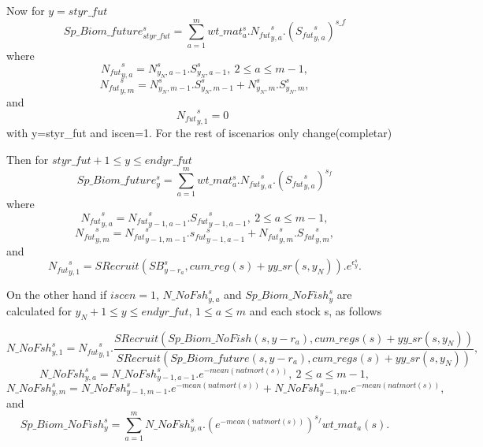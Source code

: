 \documentclass{article}
\begin{document}
Now for $y=styr\_fut$
\begin{equation}
    Sp\_Biom\_future^s_{styr\_fut}= \sum_{a=1}^mwt\_{mat}^s_a.{N_{fut}}^s_{y,a}.({{S_{fut}}^s_{y,a}})^{s\_f}
\end{equation}
where 
\begin{equation}
    {N_{fut}}^s_{y,a}=N^s_{y_N,a-1}.S^s_{y_N,a-1}, \ 2\leq a \leq m-1,
\end{equation}
\begin{equation}
    {N_{fut}}^s_{y,m}=N^s_{y_N,m-1}.S^s_{y_N,m-1}+N^s_{y_N,m}.S^s_{y_N,m},
\end{equation}
and 
\begin{equation}
    {N_{fut}}^s_{y,1}=0 \ \ 
\end{equation}
with y=styr\_fut and iscen=1. For the rest of iscenarios only change(completar) 
\begin{equation}
    
\end{equation}


Then for $styr\_fut+1 \leq y \leq endyr\_fut$
\begin{equation}
    Sp\_Biom\_future^s_y = \sum_{a=1}^m wt\_mat^s_{a}.{N_{fut}}^s_{y,a}.({S_{fut}}^s_{y,a})^{s_f}
\end{equation}
where
\begin{equation}
   {N_{fut}}^s_{y,a}={N_{fut}}^s_{y-1,a-1}.{S_{fut}}^s_{y-1,a-1},  \ 2\leq a \leq m-1,
\end{equation}
\begin{equation}
    {N_{fut}}^s_{y,m}={N_{fut}}^s_{y-1,m-1}.{s_{fut}}^s_{y-1,a-1} + {N_{fut}}^s_{y,m}.{S_{fut}}^s_{y,m},
\end{equation}
and
\begin{equation}
    {N_{fut}}^s_{y,1}=SRecruit(SB^s_{y-r_a},cum\_reg(s)+yy\_sr(s,y_N)).e^{\epsilon^s_{y}}.
\end{equation}


On the other hand if $iscen=1$, $N\_NoFsh^s_{y,a}$ and $Sp\_Biom\_NoFish^s_y$ are calculated for $y_N+1\leq y \leq endyr\_fut$, $1\leq a \leq m$ and each stock s, as follows

\begin{equation}
    N\_NoFsh^{s}_{y,1}={N_{fut}}^s_{y,1}.\dfrac{SRecruit(Sp\_Biom\_NoFish(s,y-r_a),cum\_regs(s)+yy\_sr(s,y_N))}{ SRecruit(Sp\_Biom\_future(s,y-r_a),cum\_regs(s)+yy\_sr(s,y_N))},
\end{equation}
\begin{equation}
    N\_NoFsh^{s}_{y,a}=N\_NoFsh^s_{y-1,a-1}.e^{-mean(natmort(s))}, \ 2\leq a\leq m-1,
\end{equation}
\begin{equation}
    N\_NoFsh^s_{y,m}=N\_NoFsh^s_{y-1,m-1}.e^{-mean(natmort(s))}+N\_NoFsh^s_{y-1,m}.e^{-mean(natmort(s))},
\end{equation}
and
\begin{equation}
    Sp\_Biom\_NoFish^s_y   = \sum_{a=1}^mN\_NoFsh^s_{y,a}.(e^{-mean(natmort(s))})^{s_f}  wt\_{mat}_a(s).
\end{equation}
\end{document}
